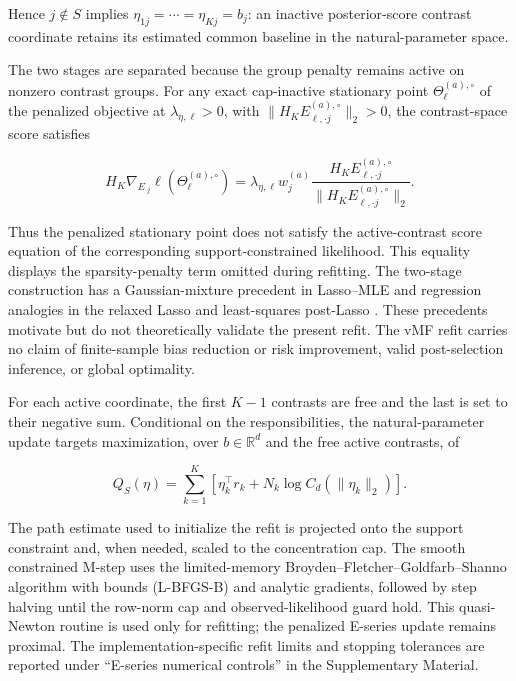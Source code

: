 \documentclass[preprint,12pt,authoryear]{elsarticle}
\newcounter{algorithm}
\begin{document}
Hence $j\notin S$ implies
$\eta_{1j}=\cdots=\eta_{Kj}=b_j$: an inactive posterior-score contrast coordinate
retains its estimated common baseline in the natural-parameter space.

The two stages are separated because the group penalty remains active on
nonzero contrast groups. For any exact cap-inactive stationary point
$\Theta_{\ell}^{(a),\circ}$ of the penalized objective at
$\lambda_{\eta,\ell}>0$, with
$\lVert H_KE_{\ell,\cdot j}^{(a),\circ}\rVert_2>0$, the contrast-space score
satisfies

\begin{equation}
\label{eq:active-penalized-score}
H_K\nabla_{E_{\cdot j}}\ell
\left(\Theta_{\ell}^{(a),\circ}\right)
=\lambda_{\eta,\ell}w_j^{(a)}
\frac{H_KE_{\ell,\cdot j}^{(a),\circ}}
{\lVert H_KE_{\ell,\cdot j}^{(a),\circ}\rVert_2}.
\end{equation}

Thus the penalized stationary point does not satisfy the active-contrast score
equation of the corresponding support-constrained likelihood. This equality
displays the sparsity-penalty term omitted during refitting. The two-stage
construction has a Gaussian-mixture precedent in Lasso--MLE
\citep{meynet2012thesis,meynet2012sparse} and regression analogies in the
relaxed Lasso and least-squares post-Lasso
\citep{meinshausen2007relaxed,belloni2013postlasso}. These precedents motivate
but do not theoretically validate the present refit. The vMF refit carries no
claim of finite-sample bias reduction or risk improvement, valid post-selection
inference, or global optimality.

For each active coordinate, the first $K-1$ contrasts are free and the last is
set to their negative sum. Conditional on the responsibilities, the
natural-parameter update targets maximization, over $b\in\mathbb R^d$ and the
free active contrasts, of

\begin{equation}
\label{eq:refit-q}
Q_S(\eta)
=\sum_{k=1}^K
\left[
\eta_k^\top r_k
+N_k\log C_d(\lVert\eta_k\rVert_2)
\right].
\end{equation}

The path estimate used to initialize the refit is projected onto the support
constraint and, when needed, scaled to the concentration cap. The smooth
constrained M-step uses the
limited-memory Broyden--Fletcher--Goldfarb--Shanno algorithm with bounds
(L-BFGS-B) \citep{byrd1995lbfgsb} and analytic gradients, followed by step
halving until the row-norm cap and observed-likelihood guard hold. This
quasi-Newton routine is used only for refitting; the penalized E-series update
remains proximal. The implementation-specific refit limits and stopping
tolerances are reported under ``E-series numerical controls'' in the
Supplementary Material.
\end{document}
